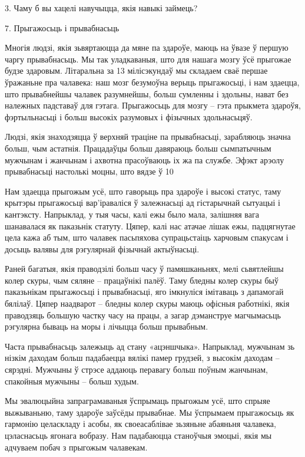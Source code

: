 3. Чаму б вы хацелі навучыцца, якія навыкі займець?


7. Прыгажосьць і прывабнасьць

Многія людзі, якія зьвяртаюцца да мяне па здароўе, маюць на ўвазе ў першую чаргу прывабнасьць. Мы так уладкаваныя, што для нашага мозгу ўсё прыгожае будзе здаровым. Літаральна за 13 мілісэкундаў мы складаем сваё першае ўражаньне пра чалавека: наш мозг безумоўна верыць прыгажосьці, і нам здаецца, што прывабнейшы чалавек разумнейшы, больш сумленны і здольны, нават без належных падставаў для гэтага. Прыгажосьць для мозгу – гэта прыкмета здароўя, фэртыльнасьці і больш высокіх разумовых і фізычных здольнасьцяў.

Людзі, якія знаходзяцца ў верхняй траціне па прывабнасьці, зарабляюць значна больш, чым астатнія. Працадаўцы больш давяраюць больш сымпатычным мужчынам і жанчынам і ахвотна прасоўваюць іх жа па службе. Эфэкт арэолу прывабнасьці настолькі моцны, што вядзе ў 10%

Нам здаецца прыгожым усё, што гаворыць пра здароўе і высокі статус, таму крытэры прыгажосьці вар'іраваліся ў залежнасьці ад гістарычнай сытуацыі і кантэксту. Напрыклад, у тыя часы, калі ежы было мала, залішняя вага шанавалася як паказьнік статуту. Цяпер, калі нас атачае лішак ежы, падцягнутае цела кажа аб тым, што чалавек пасьпяхова супрацьстаіць харчовым спакусам і досыць валявы для рэгулярнай фізычнай актыўнасьці.

Раней багатыя, якія праводзілі больш часу ў памяшканьнях, мелі сьвятлейшы колер скуры, чым сяляне – працаўнікі палёў. Таму бледны колер скуры быў паказьнікам прыгажосьці і прывабнасьці, яго імкнуліся імітаваць з дапамогай бялілаў. Цяпер наадварот – бледны колер скуры маюць офісныя работнікі, якія праводзяць большую частку часу на працы, а загар дэманструе магчымасьць рэгулярна бываць на моры і лічыцца больш прывабным.

Часта прывабнасьць залежыць ад стану «ацэншчыка». Напрыклад, мужчынам зь нізкім даходам больш падабаецца вялікі памер грудзей, з высокім даходам – сярэдні. Мужчыны ў стрэсе аддаюць перавагу больш поўным жанчынам, спакойныя мужчыны – больш худым.

Мы эвалюцыйна запраграмаваныя ўспрымаць прыгожым усё, што спрыяе выжываньню, таму здароўе заўсёды прывабнае. Мы ўспрымаем прыгажосьць як гармонію целаскладу і асобы, як своеасаблівае зьзяньне абаяньня чалавека, цэласнасьць ягонага вобразу. Нам падабаюцца станоўчыя эмоцыі, якія мы адчуваем побач з прыгожым чалавекам.


